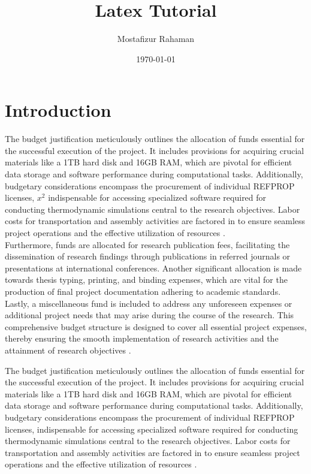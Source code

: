 \documentclass[10pt]{article}
\title{Latex Tutorial}
\author{Mostafizur Rahaman}
\date{\today}
\begin{document}
\maketitle
\newpage
\tableofcontents
\newpage


\section{Introduction}
The budget justification meticulously outlines the allocation of funds essential for the successful execution of the project. It includes provisions for acquiring crucial materials like a 1TB hard disk and 16GB RAM, which are pivotal for efficient data storage and software performance during computational tasks. Additionally, budgetary considerations encompass the procurement of individual REFPROP licenses, $x^2$ indispensable for accessing specialized software required for conducting thermodynamic simulations central to the research objectives. Labor costs for transportation and assembly activities are factored in to ensure seamless project operations and the effective utilization of \cite{mostakim2021harnessing} resources \citep{yamamoto2001design}. \\

Furthermore, funds are allocated for research publication fees, facilitating the dissemination of research findings through publications in referred journals or presentations at international conferences. Another significant allocation is made towards thesis typing, printing, and binding expenses, which are vital for the production of final project documentation adhering to academic standards. Lastly, a miscellaneous fund is included to address any unforeseen expenses or additional project needs that may arise during the course of the research. This comprehensive budget structure is designed to cover all essential project expenses, thereby ensuring the smooth implementation of research activities and the attainment of research objectives \citep{auld2013organic}.

The budget justification meticulously outlines the allocation of funds essential for the successful execution of the project. It includes provisions for acquiring crucial materials like a 1TB hard disk and 16GB RAM, which are pivotal for efficient data storage and software performance during computational tasks. Additionally, budgetary considerations encompass the procurement of individual REFPROP licenses, indispensable for accessing specialized software required for conducting thermodynamic simulations central to the research objectives. Labor costs for transportation and assembly activities are factored in to ensure seamless project operations and the effective utilization of resources \citep{yamamoto2001design}. \\
\end{document}
